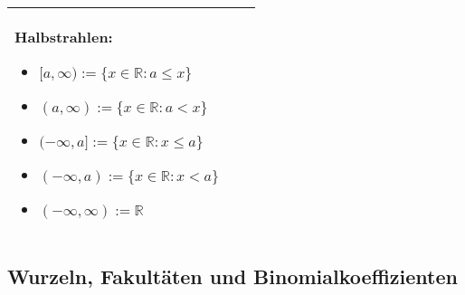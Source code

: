 \begin{longtable}{p{0.75cm} p{1cm} p{16cm}}
                        \textbf{Halbstrahlen:}
                        \begin{itemize}[topsep=-0.5cm]
                            \item $[a,\infty) := \{x \in \mathbb{R} : a \leq x\}$
                            \item $(a, \infty) := \{x \in \mathbb{R} : a < x\}$
                            \item $(-\infty, a] := \{x \in \mathbb{R}: x \leq a\}$
                            \item $(-\infty,a) := \{x \in \mathbb{R} : x < a\}$
                            \item $(-\infty,\infty):= \mathbb{R}$
                        \end{itemize} \vspace{-0cm} \\
        \bottomrule
        
    \end{longtable}

\pagebreak

\subsection{Wurzeln, Fakultäten und Binomialkoeffizienten}
      
